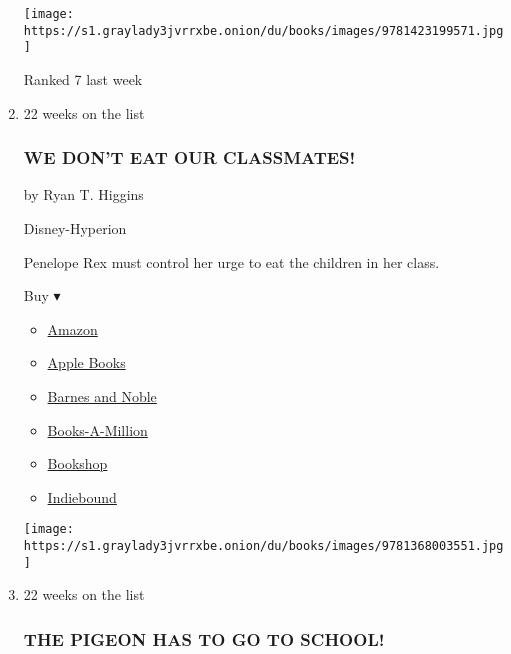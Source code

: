 \begin{enumerate}
  \texttt{[image: https://s1.graylady3jvrrxbe.onion/du/books/images/9781423199571.jpg]}

  Ranked 7 last week
\item
  22 weeks on the list

  \hypertarget{we-dont-eat-our-classmates}{%
  \subsubsection{WE DON'T EAT OUR
  CLASSMATES!}\label{we-dont-eat-our-classmates}}

  by Ryan T. Higgins

  Disney-Hyperion

  Penelope Rex must control her urge to eat the children in her class.

  Buy ▾

  \begin{itemize}
  \tightlist
  \item
    \href{https://www.amazon.com/We-Dont-Eat-Our-Classmates/dp/1368003559?tag=NYTBS-20}{Amazon}
  \item
    \href{https://du-gae-books-dot-nyt-du-prd.appspot.com/buy?title=WE+DON\%27T+EAT+OUR+CLASSMATES\%21\&author=Ryan+T+Higgins}{Apple
    Books}
  \item
    \href{https://www.anrdoezrs.net/click-7990613-11819508?url=https\%3A\%2F\%2Fwww.barnesandnoble.com\%2Fw\%2F\%3Fean\%3D9781368003551}{Barnes
    and Noble}
  \item
    \href{https://www.anrdoezrs.net/click-7990613-35140?url=https\%3A\%2F\%2Fwww.booksamillion.com\%2Fp\%2FWE\%2BDON\%2527T\%2BEAT\%2BOUR\%2BCLASSMATES\%2521\%2FRyan\%2BT\%2BHiggins\%2F9781368003551}{Books-A-Million}
  \item
    \href{https://bookshop.org/a/3546/9781368003551}{Bookshop}
  \item
    \href{https://www.indiebound.org/book/9781368003551?aff=NYT}{Indiebound}
  \end{itemize}

  \texttt{[image: https://s1.graylady3jvrrxbe.onion/du/books/images/9781368003551.jpg]}
\item
  22 weeks on the list

  \hypertarget{the-pigeon-has-to-go-to-school}{%
  \subsubsection{THE PIGEON HAS TO GO TO
  SCHOOL!}\label{the-pigeon-has-to-go-to-school}}


\end{enumerate}
